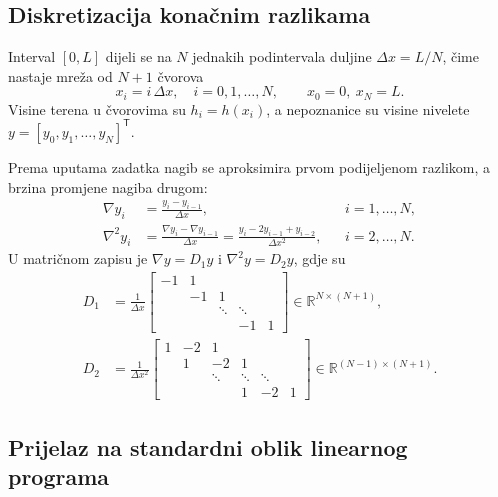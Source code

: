 \subsection{Diskretizacija konačnim razlikama}

Interval $[0, L]$ dijeli se na $N$ jednakih podintervala duljine $\Delta x = L/N$, čime nastaje mreža od $N+1$ čvorova
\begin{equation}
x_i = i \, \Delta x, \quad i = 0, 1, \dots, N, \qquad x_0 = 0, \ x_N = L .
\end{equation}
Visine terena u čvorovima su $h_i = h(x_i)$, a nepoznanice su visine nivelete $y = [y_0, y_1, \dots, y_N]^{\mathsf{T}}$.

Prema uputama zadatka nagib se aproksimira prvom podijeljenom razlikom, a brzina promjene nagiba drugom:
\begin{equation}
\begin{aligned}
\nabla y_i &= \frac{y_i - y_{i-1}}{\Delta x}, && i = 1, \dots, N, \\
\nabla^2 y_i &= \frac{\nabla y_i - \nabla y_{i-1}}{\Delta x}
= \frac{y_i - 2y_{i-1} + y_{i-2}}{\Delta x^2}, && i = 2, \dots, N .
\end{aligned}
\end{equation}
U matričnom zapisu je $\nabla y = D_1 y$ i $\nabla^2 y = D_2 y$, gdje su
\begin{equation}
\begin{aligned}
D_1 &= \frac{1}{\Delta x}
\begin{bmatrix}
-1 & 1 & & & \\
& -1 & 1 & & \\
& & \ddots & \ddots & \\
& & & -1 & 1
\end{bmatrix} \in \mathbb{R}^{N \times (N+1)}, \\[3pt]
D_2 &= \frac{1}{\Delta x^2}
\begin{bmatrix}
1 & -2 & 1 & & \\
& 1 & -2 & 1 & \\
& & \ddots & \ddots & \ddots \\
& & & 1 & -2 & 1
\end{bmatrix} \in \mathbb{R}^{(N-1) \times (N+1)} .
\end{aligned}
\end{equation}

\subsection{Prijelaz na standardni oblik linearnog programa}


